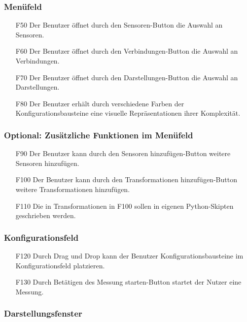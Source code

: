 \documentclass[parskip=full]{scrartcl}
\begin{document}
\subsubsection{Menüfeld}

\begin{itemize}
\item[F50] Der Benutzer öffnet durch den Sensoren-Button die Auswahl an Sensoren.
\item[F60] Der Benutzer öffnet durch den Verbindungen-Button die Auswahl an Verbindungen.
\item[F70] Der Benutzer öffnet durch den Darstellungen-Button die Auswahl an Darstellungen.
\item[F80] Der Benutzer erhält durch verschiedene Farben der Konfigurationsbausteine eine visuelle Repräsentationen ihrer Komplexität.
\end{itemize}

\subsubsection{Optional: Zusätzliche Funktionen im Menüfeld}

\begin{itemize}

\item[F90] Der Benutzer kann durch den Sensoren hinzufügen-Button weitere Sensoren hinzufügen.
\item[F100] Der Benutzer kann durch den Transformationen hinzufügen-Button weitere Transformationen hinzufügen.
\item[F110] Die in Transformationen in F100 sollen in eigenen Python-Skipten geschrieben werden.
\end{itemize}

\subsubsection{Konfigurationsfeld}

\begin{itemize}
\item[F120] Durch Drag und Drop kann der Benutzer Konfigurationsbausteine im Konfigurationsfeld platzieren.
\item[F130] Durch Betätigen des Messung starten-Button startet der Nutzer eine Messung.
\end{itemize}

\subsubsection{Darstellungsfenster}
\end{document}

